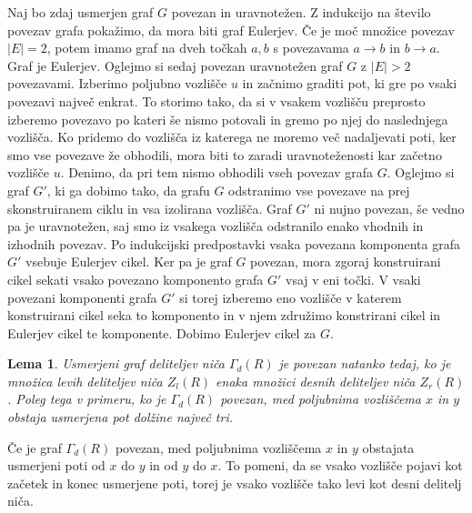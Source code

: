 \documentclass[a4paper, 12pt]{amsart}
\theoremstyle{definition} %
\theoremstyle{plain} %
\newtheorem{lema}[definicija]{Lema}
\begin{document}
Naj bo zdaj usmerjen graf $G$ povezan in uravnotežen. Z indukcijo na število povezav grafa pokažimo, da mora biti graf Eulerjev. Če je moč množice povezav $|E|=2$, potem imamo graf na dveh točkah $a,b$ s povezavama $a\rightarrow b$ in $b\rightarrow a$. Graf je Eulerjev. Oglejmo si sedaj povezan uravnotežen graf $G$ z $|E|> 2$ povezavami. Izberimo poljubno vozlišče $u$ in začnimo graditi pot, ki gre po vsaki povezavi največ enkrat. To storimo tako, da si v vsakem vozlišču preprosto izberemo povezavo po kateri še nismo potovali in gremo po njej do naslednjega vozlišča. Ko pridemo do vozlišča iz katerega ne moremo več nadaljevati poti, ker smo vse povezave že obhodili, mora biti to zaradi uravnoteženosti kar začetno vozlišče $u$. Denimo, da pri tem nismo obhodili vseh povezav grafa $G$. Oglejmo si graf $G'$, ki ga dobimo tako, da grafu $G$ odstranimo vse povezave na prej skonstruiranem ciklu in vsa izolirana vozlišča. Graf $G'$ ni nujno povezan, še vedno pa je uravnotežen, saj smo iz vsakega vozlišča odstranilo enako vhodnih in izhodnih povezav. Po indukcijski predpostavki vsaka povezana komponenta grafa $G'$ vsebuje Eulerjev cikel. Ker pa je graf $G$ povezan, mora zgoraj konstruirani cikel sekati vsako povezano komponento grafa $G'$ vsaj v eni točki. V vsaki povezani komponenti grafa $G'$ si torej izberemo eno vozlišče v katerem konstruirani cikel seka to komponento in v njem združimo konstrirani cikel in Eulerjev cikel te komponente. Dobimo Eulerjev cikel za $G$.
\endproof

\begin{lema}
\label{usmerjeniGrafDeliteljevNicaPovezanost}
Usmerjeni graf deliteljev niča $\Gamma_d(R)$ je povezan natanko tedaj, ko je množica levih deliteljev niča $Z_l(R)$ enaka množici desnih deliteljev niča $Z_r(R)$. Poleg tega v primeru, ko je $\Gamma_d(R)$ povezan, med poljubnima vozliščema $x$ in $y$ obstaja usmerjena pot dolžine največ tri.
\end{lema}

\proof
Če je graf $\Gamma_d(R)$ povezan, med poljubnima vozliščema $x$ in $y$ obstajata usmerjeni poti od $x$ do $y$ in od $y$ do $x$. To pomeni, da se vsako vozlišče pojavi kot začetek in konec usmerjene poti, torej  je vsako vozlišče tako levi kot desni delitelj niča. 
\end{document}
